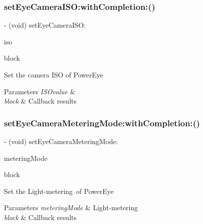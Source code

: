 \subsubsection{\texorpdfstring{set\+Eye\+Camera\+I\+S\+O\+:with\+Completion\+:()}{setEyeCameraISO:withCompletion:()}}
{\footnotesize\ttfamily -\/ (void) set\+Eye\+Camera\+I\+S\+O\+: \begin{DoxyParamCaption}\item[{(P\+V\+Eye\+Camera\+I\+SO)}]{iso }\item[{withCompletion:(P\+V\+Completion\+Block)}]{block }\end{DoxyParamCaption}}

Set the camera I\+SO of Power\+Eye


\begin{DoxyParams}{Parameters}
{\em I\+S\+Ovalue} & \\
\hline
{\em block} & Callback results \\
\hline
\end{DoxyParams}
\mbox{\label{interface_p_v_eye_camera_af020113c68a6a7e20c888ef2b6181c8a}} 
\subsubsection{\texorpdfstring{set\+Eye\+Camera\+Metering\+Mode\+:with\+Completion\+:()}{setEyeCameraMeteringMode:withCompletion:()}}
{\footnotesize\ttfamily -\/ (void) set\+Eye\+Camera\+Metering\+Mode\+: \begin{DoxyParamCaption}\item[{(P\+V\+Eye\+Camera\+Metering\+Mode)}]{metering\+Mode }\item[{withCompletion:(P\+V\+Completion\+Block)}]{block }\end{DoxyParamCaption}}

Set the Light-\/metering of Power\+Eye


\begin{DoxyParams}{Parameters}
{\em metering\+Mode} & Light-\/metering \\
\hline
{\em block} & Callback results \\
\hline
\end{DoxyParams}
\mbox{\label{interface_p_v_eye_camera_aeb9dbca0f5efc52162ffa13365040f8d}} 
